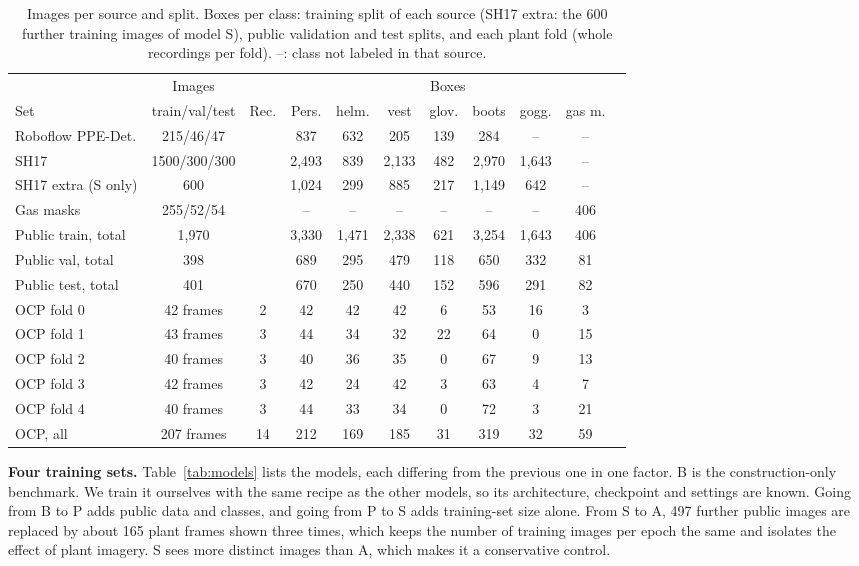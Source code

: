 \vspace{6pt}
\begin{table}[H]
\caption{Images per source and split. Boxes per class: training split of each source (SH17 extra: the 600 further training images of model S), public validation and test splits, and each plant fold (whole recordings per fold). --: class not labeled in that source.}
\label{tab:data}
\centering
\scriptsize
\setlength{\tabcolsep}{3.5pt}
\begin{tabular}{lcccccccccc}
\toprule
& Images & & \multicolumn{7}{c}{Boxes} \\
\cmidrule(lr){4-10}
Set & train/val/test & Rec. & Pers. & helm. & vest & glov. & boots & gogg. & gas m. \\
\midrule
Roboflow PPE-Det. & 215/46/47 & & 837 & 632 & 205 & 139 & 284 & -- & -- \\
SH17 & 1500/300/300 & & 2{,}493 & 839 & 2{,}133 & 482 & 2{,}970 & 1{,}643 & -- \\
SH17 extra (S only) & 600 & & 1{,}024 & 299 & 885 & 217 & 1{,}149 & 642 & -- \\
Gas masks & 255/52/54 & & -- & -- & -- & -- & -- & -- & 406 \\
Public train, total & 1{,}970 & & 3{,}330 & 1{,}471 & 2{,}338 & 621 & 3{,}254 & 1{,}643 & 406 \\
Public val, total & 398 & & 689 & 295 & 479 & 118 & 650 & 332 & 81 \\
Public test, total & 401 & & 670 & 250 & 440 & 152 & 596 & 291 & 82 \\
\midrule
OCP fold 0 & 42 frames & 2 & 42 & 42 & 42 & 6  & 53 & 16 & 3 \\
OCP fold 1 & 43 frames & 3 & 44 & 34 & 32 & 22 & 64 & 0  & 15 \\
OCP fold 2 & 40 frames & 3 & 40 & 36 & 35 & 0  & 67 & 9  & 13 \\
OCP fold 3 & 42 frames & 3 & 42 & 24 & 42 & 3  & 63 & 4  & 7 \\
OCP fold 4 & 40 frames & 3 & 44 & 33 & 34 & 0  & 72 & 3  & 21 \\
OCP, all   & 207 frames & 14 & 212 & 169 & 185 & 31 & 319 & 32 & 59 \\
\bottomrule
\end{tabular}
\end{table}

\textbf{Four training sets.} Table~\ref{tab:models} lists the models, each differing from the previous one in one factor. B is the construction-only benchmark. We train it ourselves with the same recipe as the other models, so its architecture, checkpoint and settings are known. Going from B to P adds public data and classes, and going from P to S adds training-set size alone. From S to A, 497 further public images are replaced by about 165 plant frames shown three times, which keeps the number of training images per epoch the same and isolates the effect of plant imagery. S sees more distinct images than A, which makes it a conservative control.

